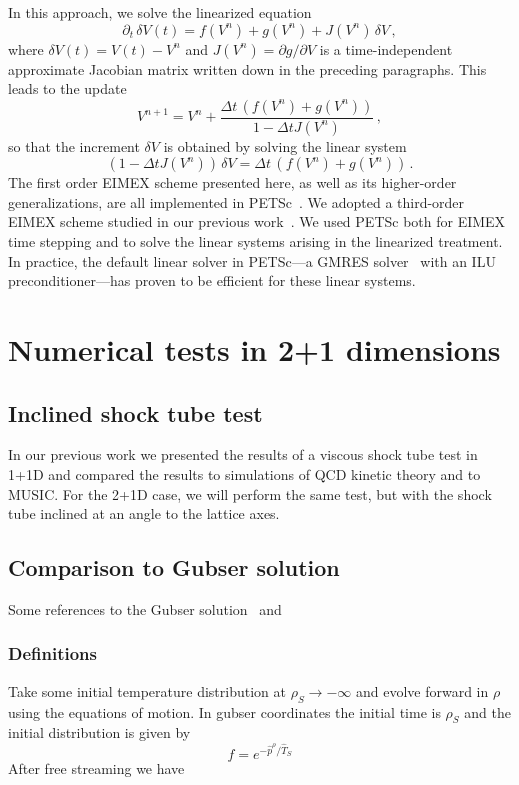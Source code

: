 \documentclass[12pt,aps,preprint,nofootinbib,noshowkeys,noshowpacs,longbibliography,superscriptaddress,tightenlines]{revtex4-2}
\def\st{\begin{equation}}
\def\stp{\end{equation}}
\begin{document}
In this approach, we solve the linearized equation
\st
\partial_t \, \delta V(t)
= f(V^n) + g(V^n) + J(V^n)\,\delta V \,,
\stp
where $\delta V(t) = V(t) - V^n$ and
$J(V^n) = \partial g/\partial V$ is a time-independent
approximate Jacobian matrix written down in the preceding paragraphs.
This leads to the update
\st
V^{n+1}
= V^n
+ \frac{\Delta t \, (f(V^n) + g(V^n))}
       {1 - \Delta t J(V^n)} \,,
\stp
so that the increment $\delta V$ is obtained by solving the
linear system
\st
(1 - \Delta t J(V^n)) \, \delta V
= \Delta t \, (f(V^n) + g(V^n)) \,.
\stp
The first order EIMEX scheme presented here,  as well as its higher-order generalizations, are all implemented in
PETSc~\cite{petsc-web-page}.  We adopted a third-order EIMEX scheme studied in
our previous work~\cite{NumericsPaper}.
We used PETSc both for EIMEX time
stepping and to solve the linear systems arising in the
linearized treatment. In practice, the default linear solver in
PETSc---a GMRES solver~\cite{trefethen1997numerical} with an
ILU preconditioner---has proven to be efficient for these
linear systems.



\section{Numerical tests in 2+1 dimensions}

\subsection{Inclined shock tube test}

In our previous work we presented the results of a viscous shock tube test in
1+1D and compared the results to simulations of QCD kinetic theory and to MUSIC.
For the 2+1D case, we will perform the same test, but with the shock tube
inclined at an angle to the lattice axes.  

\subsection{Comparison to Gubser solution}

Some references to the Gubser solution~\cite{Gubser:2010ze,Gubser:2010ui} and ~\cite{Denicol:2014tha, Dash:2020zqx}

\subsubsection{Definitions}
Take some initial temperature distribution at $\rho_S \rightarrow -\infty$ and evolve forward in $\rho$ using the equations of motion.  In gubser coordinates the initial time is $\rho_S$ and the initial distribution is given by
\begin{equation}
   f = e^{-\hat p^\rho/\hat{T}_S }
\end{equation}
After free streaming we have 
\end{document}
